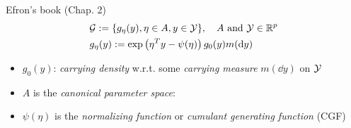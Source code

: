 Efron's book (Chap. 2)
\begin{align*}
	 & \Gc := \{g_{\eta}(y), \eta \in A, y \in \Yc \}, \quad A \text{ and } \Yc \in \Rf^p \\
	 & g_{\eta}(y) := \exp\left(\eta^T y - \psi(\eta)\right) g_0(y) m(\dd{y})
\end{align*}
\begin{itemize}
	\item $g_0(y)$: \textit{carrying density} w.r.t. some \textit{carrying measure} $m(\dd{y})$ on $\mathcal{Y}$
	\item $A$ is the \textit{canonical parameter space}:
	\item $\psi(\eta)$ is the \textit{normalizing function} or \textit{cumulant generating function} (CGF)
\end{itemize}